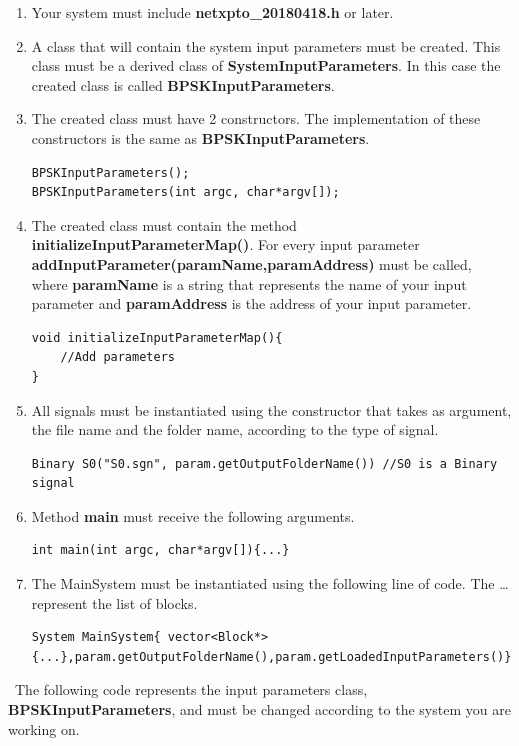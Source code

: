 \begin{enumerate}
\item Your system must include \textbf{netxpto\_20180418.h} or later.
\item A class that will contain the system input parameters must be created. This class must be a derived class of \textbf{SystemInputParameters}. In this case the created class is called \textbf{BPSKInputParameters}.
\item The created class must have 2 constructors. The implementation of these constructors is the same as \textbf{BPSKInputParameters}.
\begin{lstlisting}
BPSKInputParameters();
BPSKInputParameters(int argc, char*argv[]);
\end{lstlisting}
\item The created class must contain the method \textbf{initializeInputParameterMap()}. For every input parameter \textbf{addInputParameter(paramName,paramAddress)} must be called, where \textbf{paramName} is a string that represents the name of your input parameter and \textbf{paramAddress} is the address of your input parameter.
\begin{lstlisting}
void initializeInputParameterMap(){
	//Add parameters
}
\end{lstlisting}
\item All signals must be instantiated using the constructor that takes as argument, the file name and the folder name, according to the type of signal.
\begin{lstlisting}
Binary S0("S0.sgn", param.getOutputFolderName()) //S0 is a Binary signal
\end{lstlisting}
\item Method \textbf{main} must receive the following arguments.
\begin{lstlisting}
int main(int argc, char*argv[]){...}
\end{lstlisting}
\item The MainSystem must be instantiated using the following line of code. The \dots represent the list of blocks.
\begin{lstlisting}
System MainSystem{ vector<Block*> {...},param.getOutputFolderName(),param.getLoadedInputParameters()};
\end{lstlisting}
\end{enumerate}
\
The following code represents the input parameters class, \textbf{BPSKInputParameters}, and must be changed according to the system you are working on.
